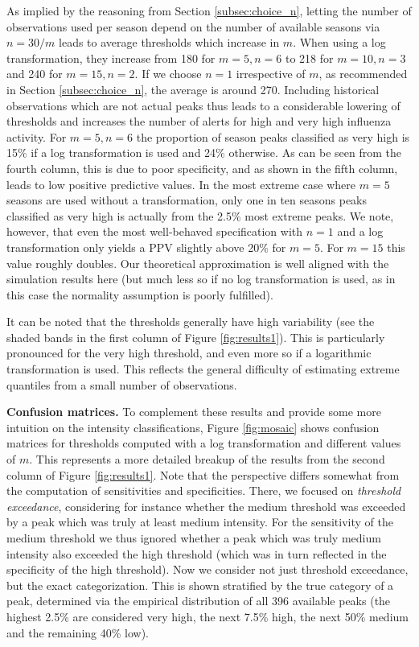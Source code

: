 \documentclass[12pt]{article}
\begin{document}
As implied by the reasoning from Section \ref{subsec:choice_n}, letting the number of observations used per season depend on the number of available seasons via $n = 30/m$ leads to average thresholds which increase in $m$. When using a log transformation, they increase from 180 for $m = 5, n = 6$ to 218 for $m = 10, n = 3$ and 240 for $m = 15, n = 2$. If we choose $n = 1$ irrespective of $m$, as recommended in Section \ref{subsec:choice_n}, the average is around 270. Including historical observations which are not actual peaks thus leads to a considerable lowering of thresholds and increases the number of alerts for high and very high influenza activity. For $m = 5, n = 6$ the proportion of season peaks classified as very high is 15\% if a log transformation is used and 24\% otherwise. As can be seen from the fourth column, this is due to poor specificity, and as shown in the fifth column, leads to low positive predictive values. In the most extreme case where $m = 5$ seasons are used without a transformation, only one in ten seasons peaks classified as very high is actually from the 2.5\% most extreme peaks. We note, however, that even the most well-behaved specification with $n = 1$ and a log transformation only yields a PPV slightly above 20\% for $m = 5$. For $m = 15$ this value roughly doubles. Our theoretical approximation is well aligned with the simulation results here (but much less so if no log transformation is used, as in this case the normality assumption is poorly fulfilled).


It can be noted that the thresholds generally have high variability (see the shaded bands in the first column of Figure \ref{fig:results1}). This is particularly pronounced for the very high threshold, and even more so if a logarithmic transformation is used. This reflects the general difficulty of estimating extreme quantiles from a small number of observations.

\textbf{Confusion matrices.} To complement these results and provide some more intuition on the intensity classifications, Figure \ref{fig:mosaic} shows confusion matrices for thresholds computed with a log transformation and different values of $m$. This represents a more detailed breakup of the results from the second column of Figure \ref{fig:results1}. Note that the perspective differs somewhat from the computation of sensitivities and specificities. There, we focused on \textit{threshold exceedance}, considering for instance whether the medium threshold was exceeded by a peak which was truly at least medium intensity. For the sensitivity of the medium threshold we thus ignored whether a peak which was truly medium intensity also exceeded the high threshold (which was in turn reflected in the specificity of the high threshold). Now we consider not just threshold exceedance, but the exact categorization. This is shown stratified by the true category of a peak, determined via the empirical distribution of all 396 available peaks (the highest 2.5\% are considered very high, the next 7.5\% high, the next 50\% medium and the remaining 40\% low).
\end{document}
